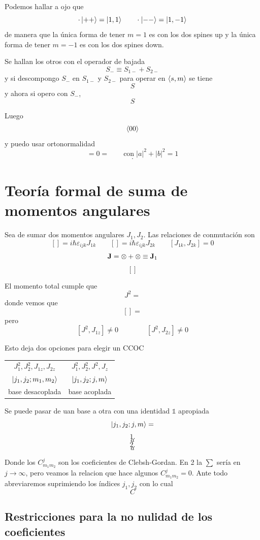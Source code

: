 \documentclass[10pt,oneside]{CBFT_book}
\begin{document}
Podemos hallar a ojo que 
\[
	\cdot \Ket{++} = \Ket{1,1} \qquad \cdot \Ket{--} = \Ket{1,-1} 
\]
de manera que la única forma de tener $m=1$ es con los dos spines up y la única forma de tener $m=-1$ es con los dos 
spines down.

Se hallan los otros con el operador de bajada
\[
	S_- \equiv S_{1-} + S_{2-}
\]
y si descompongo $S_-$ en $S_{1-}$ y $S_{2-}$ para operar en $\Braket{s,m}$ se tiene 
\[
	S
\]
y ahora si opero con $S_-$,
\[
	S
\]

Luego
\[
	\Braket{00}
\]
y puedo usar ortonormalidad 
\[
	= 0 = \qquad \text{con} \; |a|^2 + |b|^2 = 1
\]
\[
	\cdot 
\]


\section{Teoría formal de suma de momentos angulares}

Sea de sumar dos momentos angulares $J_1, J_2$. Las relaciones de conmutación son
\[
	[] = i\hbar \varepsilon_{ijk}J_{1k} \qquad [] = i\hbar \varepsilon_{ijk}J_{2k} \qquad
	[J_{1k},J_{2k}] = 0
\]
\[
	\vb{J} = \otimes + \otimes \equiv \vb{J}_1
\]
\[
	[]
\]

El momento total  cumple que 
\[
	J^2 = 
\]
donde vemos que 
\[
	[] =
\]
pero 
\[
	[ J^2 , J_{1z}] \neq 0  \qquad \qquad [ J^2 , J_{2z}] \neq 0
\]

Esto deja dos opciones para elegir un CCOC

\begin{center}
\begin{tabular}{|c|c|}
\hline 
$J_1^2, J_2^2, J_{1z}, J_{2z}$ & $J_1^2, J_2^2, J^2, J_{z}$ \\
$\Ket{j_1,j_2;m_1,m_2}$ & $\Ket{j_1,j_2;j,m}$ \\
base desacoplada & base acoplada \\
\hline
\end{tabular}
\end{center}



Se puede pasar de uan base a otra con una identidad $\mathbb{1}$ apropiada
\[
	\Ket{j_1,j_2;j,m} =
\]
\[
	1.
\]
\[
	a
\]
\[
	2.
\]
\[
	a
\]

Donde los $C_{m_1 m_2}^j$ son los coeficientes de Clebsh-Gordan. En 2 la $\sum$ sería en $j\to\infty$, pero veamos la 
relacion que hace algunos $C_{m_1 m_2}^j=0$. Ante todo abreviaremos suprimiendo los índices $j_1,j_2$ con lo cual 
\[
	C
\]

\subsection{Restricciones para la no nulidad de los coeficientes}
\end{document}
